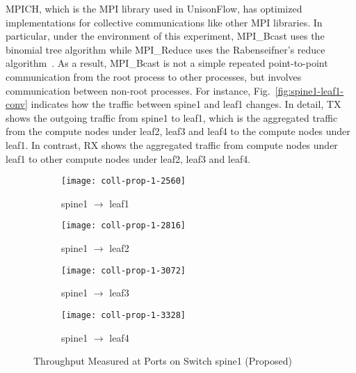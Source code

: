 MPICH, which is the MPI library used in UnisonFlow, has optimized
implementations for collective communications like other MPI libraries.
In particular, under the environment of this experiment, MPI\_Bcast uses
the binomial tree algorithm while MPI\_Reduce uses the Rabenseifner's reduce
algorithm~\autocite{Rabenseifner2004}. As a result, MPI\_Bcast is not a
simple repeated point-to-point communication from the root process to
other processes, but involves communication between non-root processes.
For instance, Fig.~\ref{fig:spine1-leaf1-conv} indicates how the traffic
between spine1 and leaf1 changes. In detail, TX shows the outgoing
traffic from spine1 to leaf1, which is the aggregated traffic from the
compute nodes under leaf2, leaf3 and leaf4 to the compute nodes
under leaf1. In contrast, RX shows the aggregated traffic from compute
nodes under leaf1 to other compute nodes under leaf2, leaf3 and leaf4.

\begin{figure}
    \centering
    \begin{subfigure}{.45\linewidth}
        \texttt{[image: coll-prop-1-2560]}
        \caption{spine1 $\to$ leaf1}%
        \label{fig:spine1-leaf1-prop}
    \end{subfigure}
    \begin{subfigure}{.45\linewidth}
        \texttt{[image: coll-prop-1-2816]}
        \caption{spine1 $\to$ leaf2}%
        \label{fig:spine1-leaf2-prop}
    \end{subfigure}
    \begin{subfigure}{.45\linewidth}
        \texttt{[image: coll-prop-1-3072]}
        \caption{spine1 $\to$ leaf3}%
        \label{fig:spine1-leaf3-prop}
    \end{subfigure}
    \begin{subfigure}{.45\linewidth}
        \texttt{[image: coll-prop-1-3328]}
        \caption{spine1 $\to$ leaf4}%
        \label{fig:spine1-leaf4-prop}
    \end{subfigure}
    \caption{Throughput Measured at Ports on Switch spine1 (Proposed)}%
    \label{fig:coll-spine1-prop}
\end{figure}

